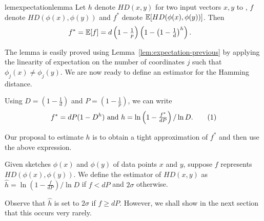 \begin{restatable}{lem}{expectationlemma}\label{lem:expectation}
Let $h$ denote $HD(x,y)$ for two input vectors $x,y$ to \fsketch, $f$ denote $HD(\phi(x),\phi(y))$ and $f^*$ denote $\mathbb{E}[HD(\phi(x),\phi(y))]$. Then
\begin{align*}
f^* = \mathbb{E}[f] & = d\left( 1-\tfrac{1}{p}\right)\left(1 - \big(1-\tfrac{1}{d}\big)^h \right).
\end{align*}
\end{restatable}

The lemma is easily proved using Lemma~\ref{lem:expectation-previous} by applying the linearity of expectation on the number of coordinates $j$ such that $\phi_j(x)\not=\phi_j(y)$. We are now ready to define an estimator for the Hamming distance.

%
Using $D=\left(1 - \tfrac{1}{d} \right)$ and $P=\left(1-\tfrac{1}{p}\right)$, we
can write 
\[
f^*=dP(1-D^h) \mbox{ and } h=\ln\left( 1 - \tfrac{f^*}{dP} \right)/\ln D.
\numberthis\label{eqn:fstar}
\]

Our proposal to estimate $h$ is to obtain a tight approximation of $f^*$ and then use the above expression.

\begin{defi}\label{defn:estimator}
Given sketches $\phi(x)$ and $\phi(y)$ of data points $x$ and $y$, suppose $f$ represents $HD(\phi(x),\phi(y))$.
We define the estimator of $HD(x,y)$ as
$\hat{h} = \ln\left( 1 - \tfrac{f}{dP} \right)/\ln D$ if $f < dP$ and $2\sigma$ otherwise.
\end{defi}

Observe that $\hat{h}$ is set to $2\sigma$ if $f \ge dP$. However, we shall show in the next section that this occurs very rarely.
%


